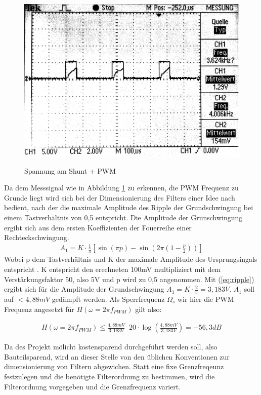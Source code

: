 \documentclass[11pt,twoside,openright]{mpreport}
\begin{document}
\begin{figure}[H]
\centering
\includegraphics[width=.8\textwidth]{oszi.png}\\
\caption{Spannung am Shunt + PWM}%
\label{fig:pwm+i}
\end{figure}



Da dem Messsignal wie in Abbildung \ref{fig:pwm+i} zu erkennen, die PWM Frequenz zu Grunde liegt wird sich bei der Dimensionierung des Filters einer Idee nach \cite{Alter2008} bedient, nach der die maximale Amplitude des Ripple der Grundschwingung bei einem
Tastverhältnis von 0,5 entspricht. Die Amplitude der Grunschwingung ergibt sich aus dem ersten Koeffizienten der Fouerreihe einer Rechteckschwingung.
\begin{align}
A_1 = K\cdot \frac{1}{\pi}[\sin(\pi p)-\sin(2\pi(1-\frac{p}{2}))]
\label{eq:ripple}
\end{align}
Wobei p dem Tastverhältnis und K der maximale Amplitude des Ursprungsingals entspricht \cite{Alter2008}. K entspricht den erechneten 100mV multipliziert mit dem Verstärkungsfaktor 50, also 5V und p wird zu 0,5
angenommen. Mit (\ref{eq:ripple}) ergibt sich für die Amplitude der Grundschwingung $ A_1 = K\cdot \frac{2}{\pi} = 3,183V$. $A_1$ soll auf $ < 4,88mV$ gedämpft werden.
Als Sperrfrequenz $\Omega_s $ wir hier die PWM Frequenz angesetzt für $H(\omega=2\pi f_{PWM})$ gilt also:

\begin{align}
H(\omega=2\pi f_{PWM}) \le \frac{4,88mV}{3,183V} \mathop{\hat{=}} 20\cdot\log(\frac{4,88mV}{3,183V})= -56,3 dB
\label{eq:daempfung}
\end{align}

Da des Projekt mölicht kostensparend durchgeführt werden soll, also Bauteilsparend, wird an dieser Stelle von den üblichen Konventionen zur dimensionierung von Filtern abgewichen.
Statt eine fixe Grenzfreqeunz festzulegen und die benötigte Filterordnung zu bestimmen, wird die Filterordnung vorgegeben und die Grenzfrequenz variert.
\end{document}
